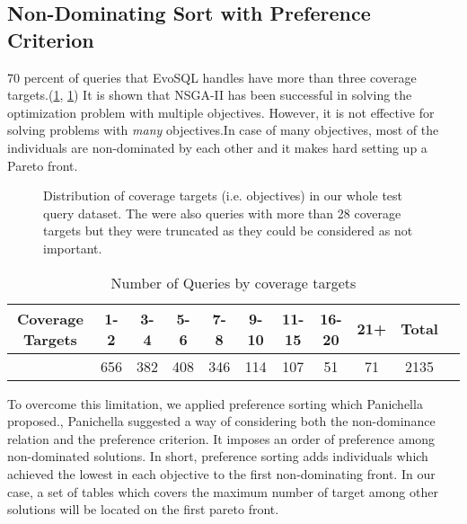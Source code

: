\subsection{Non-Dominating Sort with Preference Criterion}
70 percent of queries that EvoSQL handles have more than three coverage targets.(\cref{fig:cov_targets_dist}, \cref{tbl:num_of_coverage_targets}) It is shown that NSGA-II has been successful in solving the optimization problem with multiple objectives. However, it is not effective for solving problems with \textit{many} objectives.In case of many objectives, most of the individuals are non-dominated by each other and it makes hard setting up a Pareto front. 


\begin{figure}
	\centering
	\caption{Distribution of coverage targets (i.e. objectives) in our whole test query dataset. The were also queries with more than 28 coverage targets but they were truncated as they could be considered as not important.}
	\label{fig:cov_targets_dist}
\end{figure}

\begin{table}
	\centering
	\caption{Number of Queries by coverage targets}
	
	\begin{tabular}{c|c|c|c|c|c|c|c|c|cr}
		Coverage Targets & 1-2 & 3-4 & 5-6 & 7-8 & 9-10 & 11-15 & 16-20 & 21+ & Total \\ 
		\hline
		& 656 & 382 & 408 & 346 & 114  & 107   & 51    & 71  & 2135
	\end{tabular} 
	\label{tbl:num_of_coverage_targets}
\end{table}


To overcome this limitation, we applied preference sorting which Panichella \etal proposed., Panichella \etal suggested a way of considering both the non-dominance relation and the preference criterion. It imposes an order of preference among non-dominated solutions. In short, preference sorting adds individuals which achieved the lowest in each objective to the first non-dominating front.  In our case, a set of tables which covers the maximum number of target among other solutions will be located on the first pareto front. 



